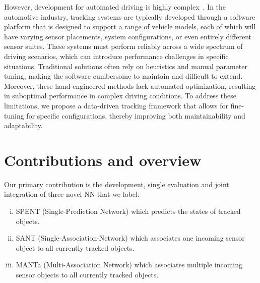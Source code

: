\documentclass[letterpaper, 10 pt, journal, twoside]{IEEEtran}
\begin{document}
However, development for automated driving is highly complex~{\cite{AD_Overview.2017,AD_book.2024}}. In the automotive industry, tracking systems are typically developed through a software platform that is designed to support a range of vehicle models, each of which will have varying sensor placements, system configurations, or even entirely different sensor suites. These systems must perform reliably across a wide spectrum of driving scenarios, which can introduce performance challenges in specific situations.
Traditional solutions often rely on heuristics and manual parameter tuning, making the software cumbersome to maintain and difficult to extend.
Moreover, these hand-engineered methods lack automated optimization, resulting in suboptimal performance in complex driving conditions. To address these limitations, we propose a data-driven tracking framework that allows for fine-tuning for specific configurations, thereby improving both maintainability and adaptability.



\section{Contributions and overview}
Our primary contribution is the development, single evaluation and joint integration of three novel \acf{NN} that we label:
\begin{enumerate}[(i)]
    \item SPENT (Single-Prediction Network) which predicts the states of tracked objects.
    \item SANT (Single-Association-Network) which associates one incoming sensor object to all currently tracked objects.
    \item MANTa (Multi-Association Network) which associates multiple incoming sensor objects to all currently tracked objects.
\end{enumerate}
\end{document}
